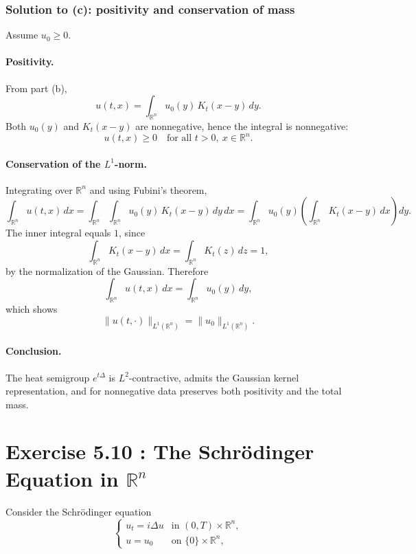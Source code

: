 \documentclass[12pt,a4paper]{article}
\theoremstyle{plain}
\theoremstyle{definition}
\theoremstyle{remark}
\theoremstyle{remark}
\begin{document}
\bigskip
\subsubsection*{Solution to (c): positivity and conservation of mass}

Assume \(u_0 \ge 0\).

\paragraph{\textbf{Positivity.}}
From part (b),
\[
u(t,x) = \int_{\mathbb{R}^n} u_0(y)\,K_t(x-y)\,dy.
\]
Both \(u_0(y)\) and \(K_t(x-y)\) are nonnegative, hence the integral is
nonnegative:
\[
u(t,x) \ge 0
\quad\text{for all } t>0,\ x\in\mathbb{R}^n.
\]

\paragraph{\textbf{Conservation of the \(L^1\)-norm.}}
Integrating over \(\mathbb{R}^n\) and using Fubini's theorem,
\[
\int_{\mathbb{R}^n} u(t,x)\,dx
= \int_{\mathbb{R}^n} \int_{\mathbb{R}^n}
u_0(y)\,K_t(x-y)\,dy\,dx
= \int_{\mathbb{R}^n} u_0(y)
\left( \int_{\mathbb{R}^n} K_t(x-y)\,dx \right) dy.
\]
The inner integral equals \(1\), since
\[
\int_{\mathbb{R}^n} K_t(x-y)\,dx
= \int_{\mathbb{R}^n} K_t(z)\,dz = 1,
\]
by the normalization of the Gaussian.
Therefore
\[
\int_{\mathbb{R}^n} u(t,x)\,dx
= \int_{\mathbb{R}^n} u_0(y)\,dy,
\]
which shows
\[
\|u(t,\cdot)\|_{L^1(\mathbb{R}^n)}
= \|u_0\|_{L^1(\mathbb{R}^n)}.
\]

\paragraph{\textbf{Conclusion.}}
The heat semigroup \(e^{t\Delta}\) is \(L^2\)-contractive,
admits the Gaussian kernel representation, and for nonnegative data
preserves both positivity and the total mass.


\section*{Exercise 5.10 : The Schrödinger Equation in $\mathbb{R}^n$}

Consider the Schrödinger equation
\[
\begin{cases}
	u_t = i \Delta u & \text{in } (0,T)\times \mathbb{R}^n, \\
	u = u_0 & \text{on } \{0\}\times \mathbb{R}^n,
\end{cases}
\tag{3}
\]
\end{document}
